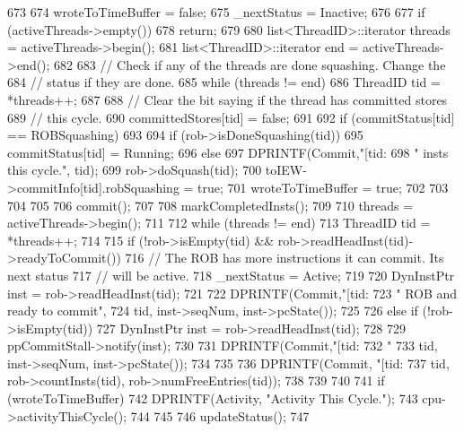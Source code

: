 \begin{DoxyCode}
673 {
674     wroteToTimeBuffer = false;
675     _nextStatus = Inactive;
676 
677     if (activeThreads->empty())
678         return;
679 
680     list<ThreadID>::iterator threads = activeThreads->begin();
681     list<ThreadID>::iterator end = activeThreads->end();
682 
683     // Check if any of the threads are done squashing.  Change the
684     // status if they are done.
685     while (threads != end) {
686         ThreadID tid = *threads++;
687 
688         // Clear the bit saying if the thread has committed stores
689         // this cycle.
690         committedStores[tid] = false;
691 
692         if (commitStatus[tid] == ROBSquashing) {
693 
694             if (rob->isDoneSquashing(tid)) {
695                 commitStatus[tid] = Running;
696             } else {
697                 DPRINTF(Commit,"[tid:%
698                         " insts this cycle.\n", tid);
699                 rob->doSquash(tid);
700                 toIEW->commitInfo[tid].robSquashing = true;
701                 wroteToTimeBuffer = true;
702             }
703         }
704     }
705 
706     commit();
707 
708     markCompletedInsts();
709 
710     threads = activeThreads->begin();
711 
712     while (threads != end) {
713         ThreadID tid = *threads++;
714 
715         if (!rob->isEmpty(tid) && rob->readHeadInst(tid)->readyToCommit()) {
716             // The ROB has more instructions it can commit. Its next status
717             // will be active.
718             _nextStatus = Active;
719 
720             DynInstPtr inst = rob->readHeadInst(tid);
721 
722             DPRINTF(Commit,"[tid:%
723                     " ROB and ready to commit\n",
724                     tid, inst->seqNum, inst->pcState());
725 
726         } else if (!rob->isEmpty(tid)) {
727             DynInstPtr inst = rob->readHeadInst(tid);
728 
729             ppCommitStall->notify(inst);
730 
731             DPRINTF(Commit,"[tid:%
732                     "%
733                     tid, inst->seqNum, inst->pcState());
734         }
735 
736         DPRINTF(Commit, "[tid:%
737                 tid, rob->countInsts(tid), rob->numFreeEntries(tid));
738     }
739 
740 
741     if (wroteToTimeBuffer) {
742         DPRINTF(Activity, "Activity This Cycle.\n");
743         cpu->activityThisCycle();
744     }
745 
746     updateStatus();
747 }
\end{DoxyCode}
